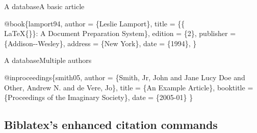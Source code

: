 \begin{frame}[fragile]{A \BibTeX{} database}{A basic article}

\begin{example}
  \begin{semiverbatim}
  \alert<2>{@book}\alert<3>{\{}\alert<4>{lamport94}\alert<5>{,}
    \alert<6>{author}    \alert<7>{= \{}\alert<8>{Leslie Lamport}\alert<7>{\},}
    \alert<6>{title}     \alert<7>{=
    \{}\alert<8-9>{\{\\LaTeX\{\}\}}\alert<8>{: A Document Preparation System}\alert<7>{\},}
    \alert<6>{edition}   \alert<7>{= \{}\alert<8>{2}\alert<7>{\},}
    \alert<6>{publisher} \alert<7>{= \{}\alert<8>{Addison-{}-Wesley}\alert<7>{\},}
    \alert<6>{address}   \alert<7>{= \{}\alert<8>{New York}\alert<7>{\},}
    \alert<6>{date}      \alert<7>{= \{}\alert<8,10>{{1994}}\alert<7>{\},}
  \alert<3>{\}}
  \end{semiverbatim}
\end{example}

\end{frame}

\begin{frame}[fragile]{A \BibTeX{} database}{Multiple authors}

\begin{example}
  \begin{semiverbatim}
  @inproceedings\{smith05,
    author    = \{\alert<4-5>{Smith, Jr, John} \alert<2>{and} \alert<3>{Jane Lucy Doe}
    \alert<2>{and} \alert<4>{Other, Andrew N.} \alert<2>{and} \alert<4>{de Vere, Jo}\},
    title     = \{An Example Article\},
    booktitle = \{Proceedings of the Imaginary Society\},
    date      = \{\alert<6>{2005-01}\}
  \}
  \end{semiverbatim}
\end{example}

\end{frame}

\subsection{Biblatex's enhanced citation commands}\label{subsec:cite-biblatex}

